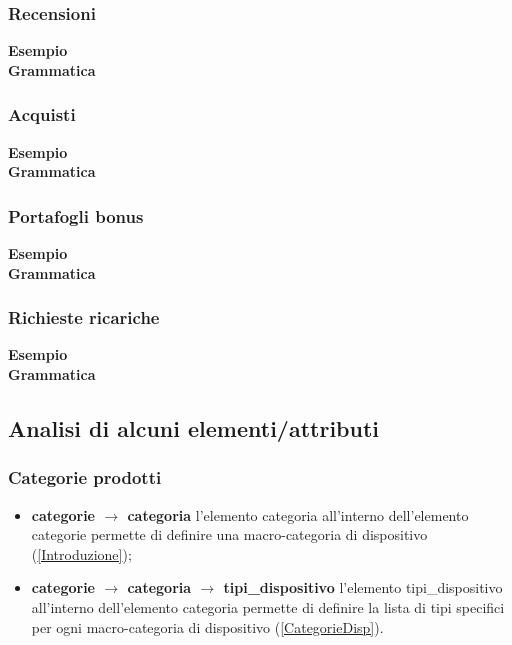 \documentclass[a4paper, 14pt]{article}
\begin{document}
\begin{flushleft}
				\subsubsection{Recensioni}
					\textbf{Esempio}\\ 
					
					\bigskip \textbf{Grammatica}\\
					
				\subsubsection{Acquisti}
					\textbf{Esempio}\\ 
					
					\bigskip \textbf{Grammatica}\\
					
				\subsubsection{Portafogli bonus}
					\textbf{Esempio}\\ 
					
					\bigskip \textbf{Grammatica}\\
					
				\subsubsection{Richieste ricariche}
					\textbf{Esempio}\\ 
					
					\bigskip \textbf{Grammatica}\\
					
		\bigskip
		
		\subsection{Analisi di alcuni elementi/attributi} \hypersetup{linkcolor=blue}
			\subsubsection{Categorie prodotti}
				\begin{itemize}
					\item \textbf{categorie $\rightarrow$ categoria} l'elemento categoria all'interno dell'elemento categorie permette di definire una macro-categoria di dispositivo (\ref{Introduzione});
					\item \textbf{categorie $\rightarrow$ categoria $\rightarrow$ tipi\_dispositivo } l'elemento tipi\_dispositivo all'interno dell'elemento categoria permette di definire la lista di tipi specifici per ogni macro-categoria di dispositivo (\ref{CategorieDisp}).
				\end{itemize}
			\smallskip

\end{flushleft}
\end{document}
